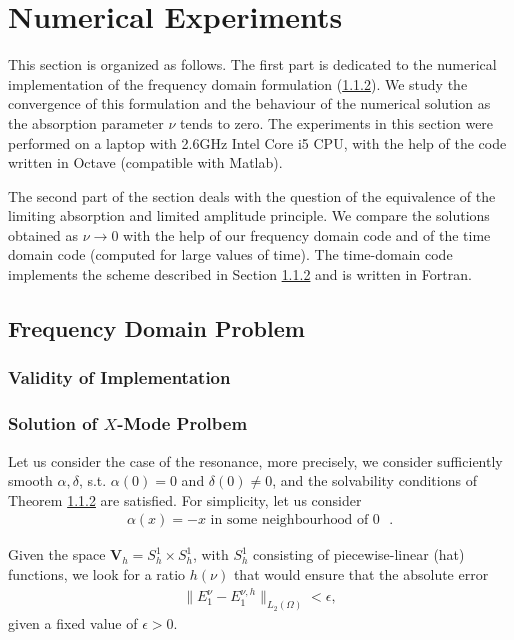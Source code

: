 \section{Numerical Experiments}
This section is organized as follows. The first part is dedicated to the numerical implementation
of the frequency domain formulation (\ref{}). We study the convergence of this formulation and the behaviour 
of the numerical solution as the absorption parameter $\nu$ tends to zero. The experiments in this section were 
performed on a laptop with 2.6GHz Intel Core i5 CPU, with the help of the code written in Octave (compatible with Matlab). 

The second part of the section deals with the question of the equivalence of the limiting absorption and limited amplitude 
principle. We compare the solutions obtained as $\nu\rightarrow 0$ with the help of our frequency domain code 
and of the time domain code (computed for large values of time). 
The time-domain code implements the scheme described in Section \ref{} and 
is written in Fortran. 
\subsection{Frequency Domain Problem}
\subsubsection{Validity of Implementation}
\subsubsection{Solution of $X$-Mode Prolbem}

Let us consider the case of the resonance, more precisely, we consider sufficiently smooth
$\alpha,\delta$, s.t. $\alpha(0)=0$ and $\delta(0)\neq 0$, and the solvability conditions 
of Theorem \ref{}  are satisfied. 
For simplicity, let us consider 
\begin{align}
\label{eq:cond}
 \alpha(x)=-x \text{  in some neighbourhood of $0$ }.
\end{align}


Given the space $\mathbf{V}_{h}=S_{h}^{1}\times S_{h}^{1}$, with $S_{h}^{1}$ consisting of piecewise-linear (hat) functions, we look for a ratio $h(\nu)$ that would ensure that the absolute error 
\begin{align}
\label{eq:problem1}
\|E^{\nu}_{1}-E^{\nu,h}_{1}\|_{L_{2}(\Omega)}<\epsilon,
\end{align}
given a fixed value of $\epsilon>0$. 


